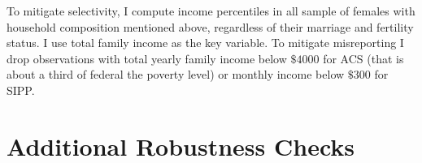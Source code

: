 \documentclass[12pt,letter]{article}
\begin{document}
To mitigate selectivity, I compute income percentiles in all sample of females with household composition mentioned above, regardless of their marriage and fertility status. I use total family income as the key variable. To mitigate misreporting I drop observations with total yearly family income below $\$4000$ for ACS (that is about a third of federal the poverty level) or monthly income below $\$300$ for SIPP.


\section{Additional Robustness Checks}

\end{document}
